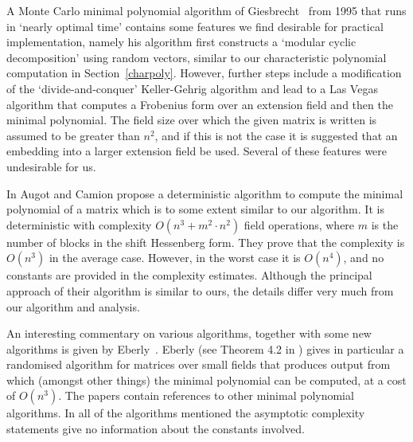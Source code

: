 A Monte Carlo minimal polynomial algorithm of Giesbrecht~\cite{Gie95} from 1995
that runs in `nearly optimal time' contains some 
features we find desirable for practical implementation, namely 
his algorithm first constructs a `modular cyclic decomposition' 
using random vectors, similar to our characteristic polynomial 
computation in Section~\ref{charpoly}. However, further steps include a 
modification of the `divide-and-conquer' 
Keller-Gehrig algorithm \cite{KelG85} and lead to a 
Las Vegas algorithm that computes a Frobenius form over an extension 
field and then the minimal polynomial.
The field size over which the given matrix is written is assumed 
to be greater than $n^2$, and if this is not the case it is 
suggested that an embedding into a larger extension field be used.
Several of these features were undesirable for us.

In \cite[Section 4]{AC97} Augot and Camion propose a deterministic algorithm
to compute the minimal polynomial of a matrix which is to some extent
similar to our algorithm. It is deterministic with
complexity $O(n^3 + m^2 \cdot n^2)$ field operations, 
where $m$ is the number of blocks
in the shift Hessenberg form. They prove that the complexity is $O(n^3)$ in the
average case. However, in the worst case it is $O(n^4)$, and 
no constants are provided in the complexity estimates. Although the
principal approach of their algorithm is similar to ours, the details
differ very much from our algorithm and analysis.

An interesting commentary on various algorithms, together with some new 
algorithms is given by Eberly~\cite{Eb00}. Eberly (see Theorem 4.2
in \cite{Eb00}) gives in particular a randomised algorithm for matrices 
over small fields that produces output from which (amongst other things)
the minimal polynomial can be computed, at a cost of $O(n^3)$.
The papers \cite{Eb00,Gie95,Stor98,Stor01} contain references to other 
minimal polynomial algorithms. In all of the algorithms mentioned 
the asymptotic complexity statements give no information about 
the constants involved. 

